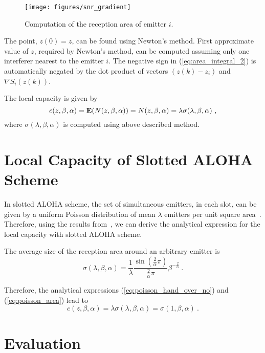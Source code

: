 \documentclass[12pt,english]{article}
\begin{document}
\begin{figure}[!t]
\centering
{}
\texttt{[image: figures/snr\_gradient]}
\caption{Computation of the reception area of emitter $i$.\label{fig:snr_gradient}}
\label{fig:rx_area_method}
\end{figure}

The point, \mbox{$z(0)=z$}, can be found using Newton's method. First approximate value of $z$, required by Newton's method, can be computed assuming only one interferer nearest to the emitter $i$. The negative sign in (\ref{eq:area_integral_2}) is automatically negated by the dot product of vectors $(z(k)-z_{i})$ and $\nabla S_{i}(z(k))$.

The local capacity is given by
$$
c(z,\beta,\alpha)={\bf E}(N(z,\beta,\alpha))=N(z,\beta,\alpha)=\lambda\sigma(\lambda,\beta,\alpha)~,
$$ 
where $\sigma(\lambda,\beta,\alpha)$ is computed using above described method. 

\section{Local Capacity of Slotted ALOHA Scheme}
\label{sec:aloha}

In slotted ALOHA scheme, the set of simultaneous emitters, in each slot, can be given by a uniform Poisson distribution of mean $\lambda$ emitters per unit square area~\cite{Jacquet:2009,SR-ALOHA,Weber2}. Therefore, using the results from~\cite{Jacquet:2009}, we can derive the analytical expression for the local capacity with slotted ALOHA scheme. 

The average size of the reception area around an arbitrary emitter is 
\begin{equation}
\sigma(\lambda,\beta,\alpha)=\frac{1}{\lambda}\frac{\sin(\frac{2}{\alpha}\pi)}{\frac{2}{\alpha}\pi}\beta^{-\frac{2}{\alpha}}~.
\label{eq:poisson_area}
\end{equation}



Therefore, the analytical expressions (\ref{eq:poisson_hand_over_no}) and (\ref{eq:poisson_area}) lead to
\begin{equation}
c(z,\beta,\alpha)=\lambda\sigma(\lambda,\beta,\alpha)=\sigma(1,\beta,\alpha)~.
\label{eq:poisson_capacity}
\end{equation}

\section{Evaluation}
\label{sec:evaluate}
\end{document}
